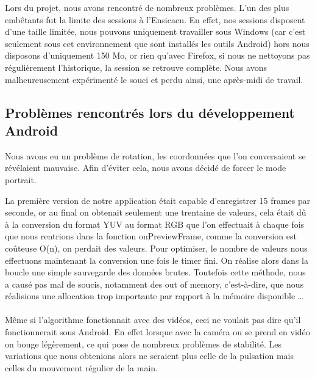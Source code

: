 Lors du projet, nous avons rencontré de nombreux problèmes. L'un des plus embêtants fut la limite des sessions à l'Ensicaen. En effet, nos sessions disposent d'une taille limitée, nous
 pouvons uniquement travailler sous Windows (car c'est seulement sous cet environnement que sont installés les outils Android) hors nous disposons d'uniquement 150 Mo, or rien qu'avec
  Firefox, si nous ne nettoyons pas régulièrement l'historique, la session se retrouve complète. Nous avons malheureusement expérimenté le souci et perdu ainsi, une après-midi de travail.

\subsection{Problèmes rencontrés lors du développement Android}

Nous avons eu un problème de rotation, les coordonnées que l'on conversaient se révélaient mauvaise. Afin d'éviter cela, nous avons décidé de forcer le mode portrait.

La première version de notre application était capable d'enregistrer 15 frames par seconde, or au final on obtenait seulement une trentaine de valeurs, cela était dû à la conversion du
 format YUV au format RGB que l'on effectuait à chaque fois que nous rentrions dans la fonction onPreviewFrame, comme la conversion est coûteuse O(n), on perdait des valeurs. Pour
  optimiser, le nombre de valeurs nous effectuons maintenant la conversion une fois le timer fini. On réalise alors dans la boucle une simple sauvegarde des données brutes.
Toutefois cette méthode, nous a causé pas mal de soucis, notamment des out of memory, c'est-à-dire, que nous réalisions une allocation trop importante par rapport à la mémoire disponible
\ldots{}\\
\\
Même si l'algorithme fonctionnait avec des vidéos, ceci ne voulait pas dire qu'il fonctionnerait sous Android. En effet lorsque avec la caméra on se prend en vidéo on bouge légèrement,
ce qui pose de nombreux problèmes de stabilité. Les variations que nous obtenions alors ne seraient plus celle de la pulsation mais celles du mouvement régulier de la main.

